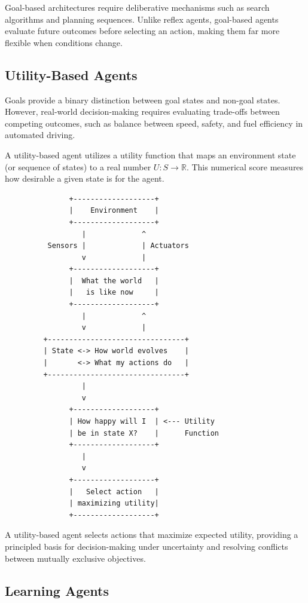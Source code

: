 \documentclass[12pt]{report}
\begin{document}
Goal-based architectures require deliberative mechanisms such as search algorithms and planning sequences. Unlike reflex agents, goal-based agents evaluate future outcomes before selecting an action, making them far more flexible when conditions change.

\subsection{Utility-Based Agents}

Goals provide a binary distinction between goal states and non-goal states. However, real-world decision-making requires evaluating trade-offs between competing outcomes, such as balance between speed, safety, and fuel efficiency in automated driving.

A utility-based agent utilizes a utility function that maps an environment state (or sequence of states) to a real number $U: S \to \mathbb{R}$. This numerical score measures how desirable a given state is for the agent.

\begin{verbatim}
               +-------------------+
               |    Environment    |
               +-------------------+
                  |             ^
          Sensors |             | Actuators
                  v             |
               +-------------------+
               |  What the world   |
               |   is like now     |
               +-------------------+
                  |             ^
                  v             |
         +--------------------------------+
         | State <-> How world evolves    |
         |       <-> What my actions do   |
         +--------------------------------+
                  |
                  v
               +-------------------+
               | How happy will I  | <--- Utility
               | be in state X?    |      Function
               +-------------------+
                  |
                  v
               +-------------------+
               |   Select action   |
               | maximizing utility|
               +-------------------+
\end{verbatim}

A utility-based agent selects actions that maximize expected utility, providing a principled basis for decision-making under uncertainty and resolving conflicts between mutually exclusive objectives.

\subsection{Learning Agents}
\end{document}
